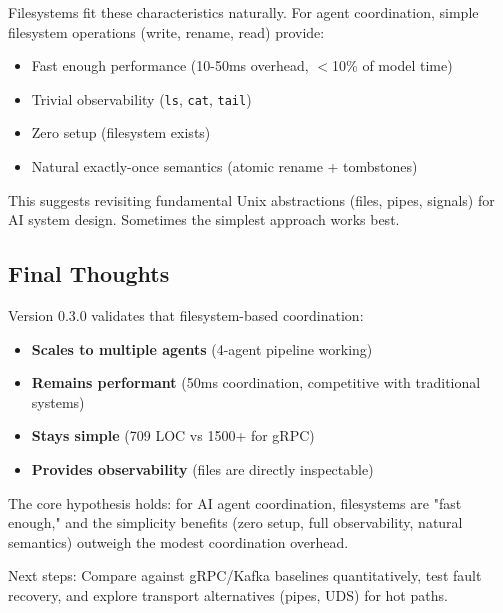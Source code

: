 \documentclass[11pt]{article}
\begin{document}
Filesystems fit these characteristics naturally. For agent coordination, simple filesystem operations (write, rename, read) provide:
\begin{itemize}
\item Fast enough performance (10-50ms overhead, $<$10\% of model time)
\item Trivial observability (\texttt{ls}, \texttt{cat}, \texttt{tail})
\item Zero setup (filesystem exists)
\item Natural exactly-once semantics (atomic rename + tombstones)
\end{itemize}

This suggests revisiting fundamental Unix abstractions (files, pipes, signals) for AI system design. Sometimes the simplest approach works best.

\subsection{Final Thoughts}

Version 0.3.0 validates that filesystem-based coordination:
\begin{itemize}
\item \textbf{Scales to multiple agents} (4-agent pipeline working)
\item \textbf{Remains performant} (50ms coordination, competitive with traditional systems)
\item \textbf{Stays simple} (709 LOC vs 1500+ for gRPC)
\item \textbf{Provides observability} (files are directly inspectable)
\end{itemize}

The core hypothesis holds: for AI agent coordination, filesystems are "fast enough," and the simplicity benefits (zero setup, full observability, natural semantics) outweigh the modest coordination overhead.

Next steps: Compare against gRPC/Kafka baselines quantitatively, test fault recovery, and explore transport alternatives (pipes, UDS) for hot paths.
\end{document}
